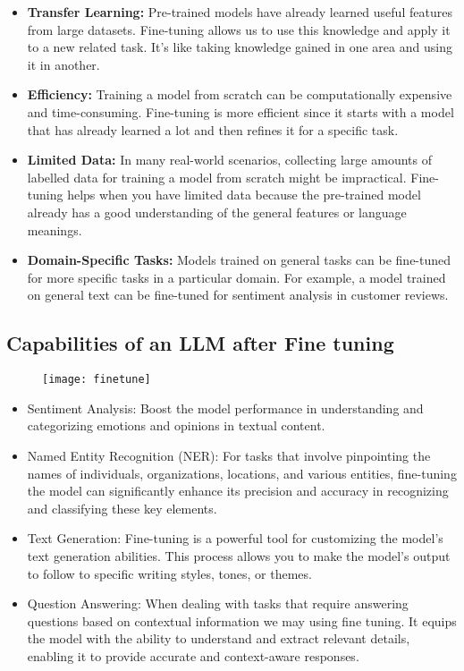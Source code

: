 \begin{itemize}
    \item \textbf{Transfer Learning:} Pre-trained models have already learned useful features from large datasets. Fine-tuning allows us to use this knowledge and apply it to a new related task. It's like taking knowledge gained in one area and using it in another.
    
    \item \textbf{Efficiency:} Training a model from scratch can be computationally expensive and time-consuming. Fine-tuning is more efficient since it starts with a model that has already learned a lot and then refines it for a specific task.
    
    \item \textbf{Limited Data:} In many real-world scenarios, collecting large amounts of labelled data for training a model from scratch might be impractical. Fine-tuning helps when you have limited data because the pre-trained model already has a good understanding of the general features or language meanings.
    
    \item \textbf{Domain-Specific Tasks:} Models trained on general tasks can be fine-tuned for more specific tasks in a particular domain. For example, a model trained on general text can be fine-tuned for sentiment analysis in customer reviews.
\end{itemize}

\subsection{Capabilities of an LLM after Fine tuning}
\begin{figure}[h]
\texttt{[image: finetune]}\\
\centering
\end{figure}
\begin{itemize}
    \item Sentiment Analysis: Boost the model performance in understanding and categorizing emotions and opinions in textual content.
    \item Named Entity Recognition (NER): For tasks that involve pinpointing the names of individuals, organizations, locations, and various entities, fine-tuning the model can significantly enhance its precision and accuracy in recognizing and classifying these key elements.
    \item Text Generation: Fine-tuning is a powerful tool for customizing the model's text generation abilities. This process allows you to make the model's output to follow to specific writing styles, tones, or themes.
    \item Question Answering: When dealing with tasks that require answering questions based on contextual information we may using fine tuning. It equips the model with the ability to understand and extract relevant details, enabling it to provide accurate and context-aware responses.
\end{itemize}


